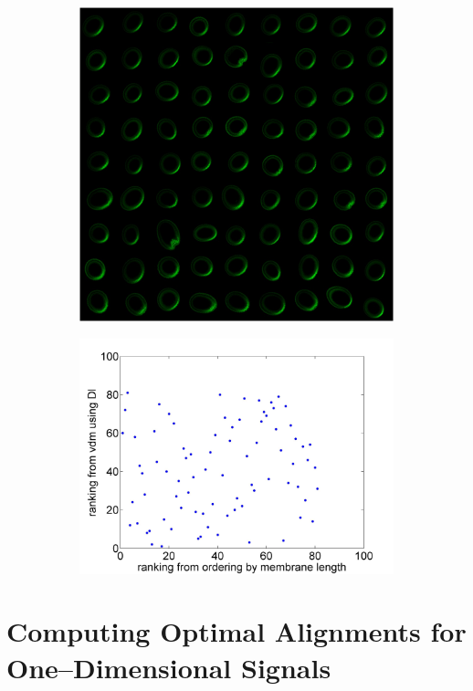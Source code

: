 \documentclass[11pt]{article}
\begin{document}
\begin{figure}
\begin{subfigure}{0.5\textwidth}
\includegraphics[width=\textwidth]{fig4c}
\caption{}
\end{subfigure}
\begin{subfigure}{0.5\textwidth}
\includegraphics[width=\textwidth]{Dl_rank_corr}
\caption{}
\end{subfigure}
\end{figure}

\appendix

\section{Computing Optimal Alignments for One--Dimensional Signals} 
\end{document}
